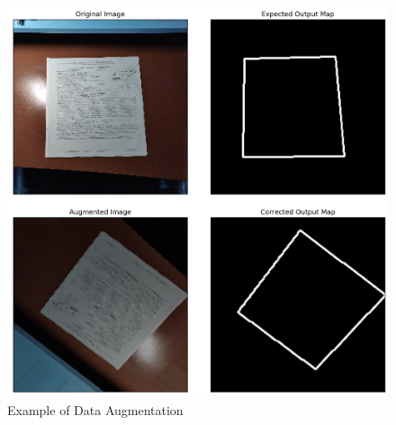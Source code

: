 \documentclass[]{article}
\begin{document}
\begin{figure}[htb!]
	\includegraphics[width=\linewidth]{augmented_image.png}
	\caption{Example of Data Augmentation}
	\label{fig:augmented_image}
\end{figure}
\end{document}
